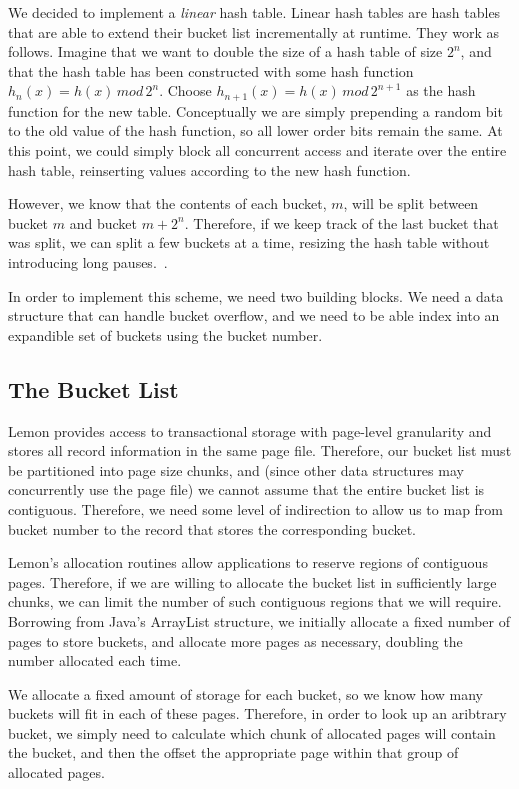 \documentclass[letterpaper,twocolumn,english]{article}
\newcommand{\yad}{Lemon\xspace}
\begin{document}
We decided to implement a {\em linear} hash table.  Linear hash tables are
hash tables that are able to extend their bucket list incrementally at
runtime. They work as follows. Imagine that we want to double the size
of a hash table of size $2^{n}$, and that the hash table has been
constructed with some hash function $h_{n}(x)=h(x)\, mod\,2^{n}$.
Choose $h_{n+1}(x)=h(x)\, mod\,2^{n+1}$ as the hash function for the
new table. Conceptually we are simply prepending a random bit to the
old value of the hash function, so all lower order bits remain the
same. At this point, we could simply block all concurrent access and
iterate over the entire hash table, reinserting values according to
the new hash function.

However, 
we know that the
contents of each bucket, $m$, will be split between bucket $m$ and
bucket $m+2^{n}$. Therefore, if we keep track of the last bucket that
was split, we can split a few buckets at a time, resizing the hash
table without introducing long pauses.~\cite{lht}. 

In order to implement this scheme, we need two building blocks.  We
need a data structure that can handle bucket overflow, and we need to
be able index into an expandible set of buckets using the bucket
number.

\subsection{The Bucket List}

\yad provides access to transactional storage with page-level
granularity and stores all record information in the same page file.
Therefore, our bucket list must be partitioned into page size chunks,
and (since other data structures may concurrently use the page file)
we cannot assume that the entire bucket list is contiguous.
Therefore, we need some level of indirection to allow us to map from
bucket number to the record that stores the corresponding bucket.

\yad's allocation routines allow applications to reserve regions of
contiguous pages.  Therefore, if we are willing to allocate the bucket
list in sufficiently large chunks, we can limit the number of such
contiguous regions that we will require.  Borrowing from Java's
ArrayList structure, we initially allocate a fixed number of pages to
store buckets, and allocate more pages as necessary, doubling the
number allocated each time.  

We allocate a fixed amount of storage for each bucket, so we know how
many buckets will fit in each of these pages.  Therefore, in order to
look up an aribtrary bucket, we simply need to calculate which chunk
of allocated pages will contain the bucket, and then the offset the
appropriate page within that group of allocated pages.  
\end{document}
